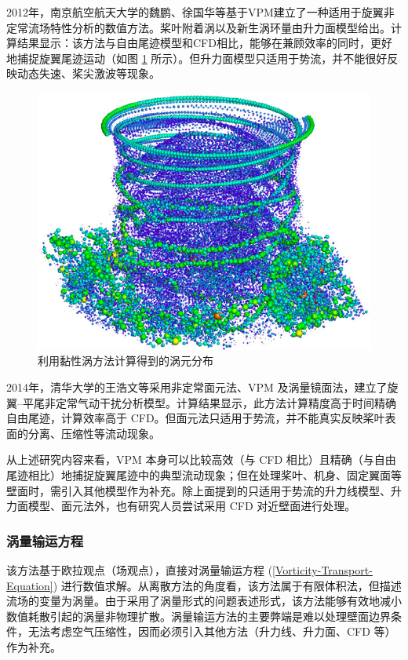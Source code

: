 2012年，南京航空航天大学的魏鹏、徐国华等基于VPM建立了一种适用于旋翼非定常流场特性分析的数值方法。桨叶附着涡以及新生涡环量由升力面模型给出。计算结果显示：该方法与自由尾迹模型和CFD相比，能够在兼顾效率的同时，更好地捕捉旋翼尾迹运动（如图
\ref{fig:vortex-particle} 所示）。但升力面模型只适用于势流，并不能很好反映动态失速、桨尖激波等现象。
\begin{figure}[h!]
\centering{}\includegraphics[height=0.26\textheight]{../review/figures/vortex-particle}
\caption{\label{fig:vortex-particle}利用黏性涡方法计算得到的涡元分布}
\end{figure}

2014年，清华大学的王浩文等采用非定常面元法、VPM 及涡量镜面法，建立了旋翼–平尾非定常气动干扰分析模型。计算结果显示，此方法计算精度高于时间精确自由尾迹，计算效率高于
CFD。但面元法只适用于势流，并不能真实反映桨叶表面的分离、压缩性等流动现象。

从上述研究内容来看，VPM 本身可以比较高效（与 CFD 相比）且精确（与自由尾迹相比）地捕捉旋翼尾迹中的典型流动现象；但在处理桨叶、机身、固定翼面等壁面时，需引入其他模型作为补充。除上面提到的只适用于势流的升力线模型、升力面模型、面元法外，也有研究人员尝试采用
CFD 对近壁面进行处理。

\subsubsection{涡量输运方程\label{sec:Vorticity-Transport-Model}}

该方法基于欧拉观点（场观点），直接对涡量输运方程 (\ref{Vorticity-Transport-Equation}) 进行数值求解。从离散方法的角度看，该方法属于有限体积法，但描述流场的变量为涡量。由于采用了涡量形式的问题表述形式，该方法能够有效地减小数值耗散引起的涡量非物理扩散。涡量输运方法的主要弊端是难以处理壁面边界条件，无法考虑空气压缩性，因而必须引入其他方法（升力线、升力面、CFD
等）作为补充。

